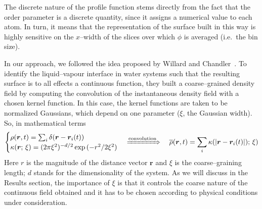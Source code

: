 The discrete nature of the profile function stems directly from the fact that the order parameter is a discrete quantity, since it assigns a numerical value to each atom. In turn, it means that the representation of the surface built in this way is highly sensitive on the $x$--width of the slices over which $\phi$ is averaged (i.e.\ the bin size). %

In our approach, we followed the idea proposed by Willard and Chandler~\cite{WilChaJCP2010}. To identify the liquid--vapour interface in water systems such that the resulting surface is to all effects a continuous function, they built a coarse--grained density field by computing the convolution of the instantaneous density field with a chosen kernel function. In this case, the kernel functions are taken to be normalized Gaussians, which depend on one parameter ($\xi$, the Gaussian width). So, in mathematical terms
\begin{equation}
\label{eqn:density-field}
    \begin{cases}
        \rho(\bm{r},t)=\sum_i \delta(\bm{r}-\bm{r}_i(t)) \\
        \kappa(\bm{r};\,\xi)= (2\pi\xi^2)^{-d/2} \exp{(-r^2/2\xi^2)}
    \end{cases}
    \xRightarrow{\text{convolution}}\quad
    \overline{\rho}(\bm{r},t)=\sum_i \kappa( |\bm{r}-\bm{r}_i(t)| );\,\xi)
\end{equation}
Here $r$ is the magnitude of the distance vector $\bm{r}$ and $\xi$ is the coarse--graining length; $d$ stands for the dimensionality of the system. As we will discuss in the Results section, the importance of $\xi$ is that it controls the coarse nature of the continuous field obtained and it has to be chosen according to physical conditions under consideration.

